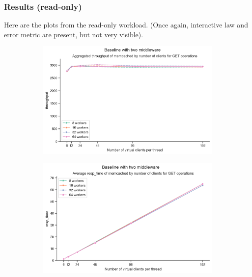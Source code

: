 \documentclass[11pt,a4paper]{article}
\begin{document}
\subsubsection{Results (read-only)}

Here are the plots from the read-only workload. (Once again, interactive law and error metric are
present, but not very visible).

\begin{figure}[H]
	\begin{subfigure}[b]{0.5\linewidth}
		\includegraphics[width=\linewidth]{images/middleware_2/last_graph_get_throughput.pdf}
	\end{subfigure}
	\begin{subfigure}[b]{0.5\linewidth}
		\includegraphics[width=\linewidth]{images/middleware_2/last_graph_get_resp_time.pdf}
	\end{subfigure}
\end{figure}
\end{document}
